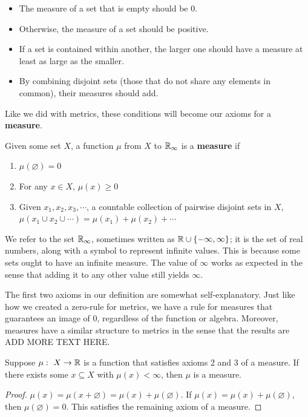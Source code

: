 \begin{itemize}
    \item The measure of a set that is empty should be $0$.
    \item Otherwise, the measure of a set should be positive.
    \item If a set is contained within another, the larger one should have a measure at least as large as the smaller.
    \item By combining disjoint sets (those that do not share any elements in common), their measures should add.
\end{itemize}

Like we did with metrics, these conditions will become our axioms for a \textbf{measure}. \par

\begin{definition}[Measure]
    Given some set $X$, a function $\mu$ from $X$ to $\mathbb{R}_\infty$ is a \textbf{measure} if
        \begin{enumerate}
            \item $\mu(\varnothing)=0$
            \item For any $x\in X$, $\mu(x)\geq0$
            \item Given $x_1,x_2,x_3,\cdots$, a countable collection of pairwise disjoint sets in $X$, $\mu\left(x_1\cup x_2\cup\cdots\right)=\mu(x_1)+\mu(x_2)+\cdots$
        \end{enumerate}
\end{definition}  

We refer to the set $\mathbb{R}_\infty$, sometimes written as $\mathbb{R}\cup\{-\infty,\infty\}$; it is the set of real numbers, along with a symbol to represent infinite values. This is because some sets ought to have an infinite measure. The value of $\infty$ works as expected in the sense that adding it to any other value still yields $\infty$.\par

The first two axioms in our definition are somewhat self-explanatory. Just like how we created a zero-rule for metrics, we have a rule for measures that guarantees an image of $0$, regardless of the function or algebra. Moreover, measures have a similar structure to metrics in the sense that the results are ADD MORE TEXT HERE. \par 

\begin{theorem}
    Suppose $\mu :\ X \to \mathbb{R}$ is a function that satisfies axioms 2 and 3 of a measure. If there exists some $x\subseteq X$ with $\mu(x)<\infty$, then $\mu$ is a measure. \par
    \begin{proof}
        $\mu(x)=\mu(x+\varnothing)=\mu(x)+\mu(\varnothing)$. If $\mu(x)=\mu(x)+\mu(\varnothing)$, then $\mu(\varnothing)=0$. This satisfies the remaining axiom of a measure. 
    \end{proof}
\end{theorem}

